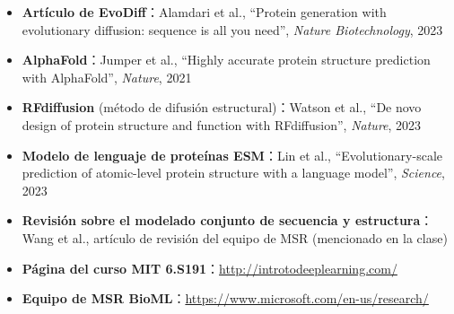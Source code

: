 \documentclass[a4paper]{article}
\begin{document}
\begin{itemize}
    \item \textbf{Artículo de EvoDiff}：Alamdari et al., ``Protein generation with evolutionary diffusion: sequence is all you need'', \textit{Nature Biotechnology}, 2023
    \item \textbf{AlphaFold}：Jumper et al., ``Highly accurate protein structure prediction with AlphaFold'', \textit{Nature}, 2021
    \item \textbf{RFdiffusion} (método de difusión estructural)：Watson et al., ``De novo design of protein structure and function with RFdiffusion'', \textit{Nature}, 2023
    \item \textbf{Modelo de lenguaje de proteínas ESM}：Lin et al., ``Evolutionary-scale prediction of atomic-level protein structure with a language model'', \textit{Science}, 2023
    \item \textbf{Revisión sobre el modelado conjunto de secuencia y estructura}：Wang et al., artículo de revisión del equipo de MSR (mencionado en la clase)
    \item \textbf{Página del curso MIT 6.S191}：\url{http://introtodeeplearning.com/}
    \item \textbf{Equipo de MSR BioML}：\url{https://www.microsoft.com/en-us/research/}
\end{itemize}

\end{document}
